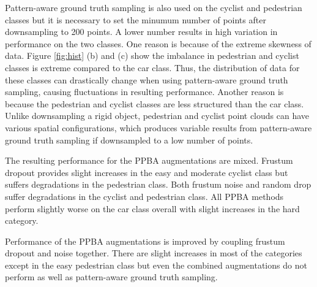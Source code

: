\documentclass[10pt, conference, compsocconf]{IEEEtran}
\begin{document}
Pattern-aware ground truth sampling is also used on the cyclist and pedestrian classes but it is necessary to set the minumum number of points after downsampling to 200 points. A lower number results in high variation in performance on the two classes. One reason is because of the extreme skewness of data. Figure \ref{fig:hist} (b) and (c) show the imbalance in pedestrian and cyclist classes is extreme compared to the car class. Thus, the distribution of data for these classes can drastically change when using pattern-aware ground truth sampling, causing fluctuations in resulting performance. Another reason is because the pedestrian and cyclist classes are less structured than the car class. Unlike downsampling a rigid object, pedestrian and cyclist point clouds can have various spatial configurations, which produces variable results from pattern-aware ground truth sampling if downsampled to a low number of points.

The resulting performance for the PPBA augmentations are mixed. Frustum dropout provides slight increases in the easy and moderate cyclist class but suffers degradations in the pedestrian class. Both frustum noise and random drop suffer degradations in the cyclist and pedestrian class. All PPBA methods perform slightly worse on the car class overall with slight increases in the hard category.

Performance of the PPBA augmentations is improved by coupling frustum dropout and noise together. There are slight increases in most of the categories except in the easy pedestrian class but even the combined augmentations do not perform as well as pattern-aware ground truth sampling.
\end{document}
